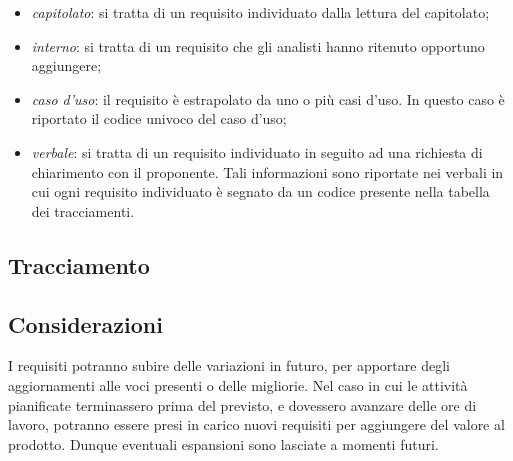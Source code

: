 \begin{itemize}
\begin{itemize}
		\item \textit{capitolato\glo}: si tratta di un requisito individuato dalla lettura del capitolato;
		\item \textit{interno}: si tratta di un requisito che gli analisti hanno ritenuto opportuno aggiungere;
		\item \textit{caso d'uso}: il requisito è estrapolato da uno o più casi d'uso. In questo caso è riportato il codice univoco del caso d'uso;
		\item \textit{verbale}: si tratta di un requisito individuato in seguito ad una richiesta di chiarimento con il proponente. Tali informazioni sono riportate nei verbali in cui ogni requisito individuato è segnato da un codice presente nella tabella dei tracciamenti.
	\end{itemize}
\end{itemize}
\renewcommand{\arraystretch}{1.5}


\pagebreak




\pagebreak
\subsection{Tracciamento}  


\subsection{Considerazioni}
I requisiti potranno subire delle variazioni in futuro, per apportare degli aggiornamenti alle voci presenti o delle migliorie. Nel caso in cui le attività pianificate terminassero prima del previsto, e dovessero avanzare delle ore di lavoro, potranno essere presi in carico nuovi requisiti per aggiungere del valore al prodotto. Dunque eventuali espansioni sono lasciate a momenti futuri. 